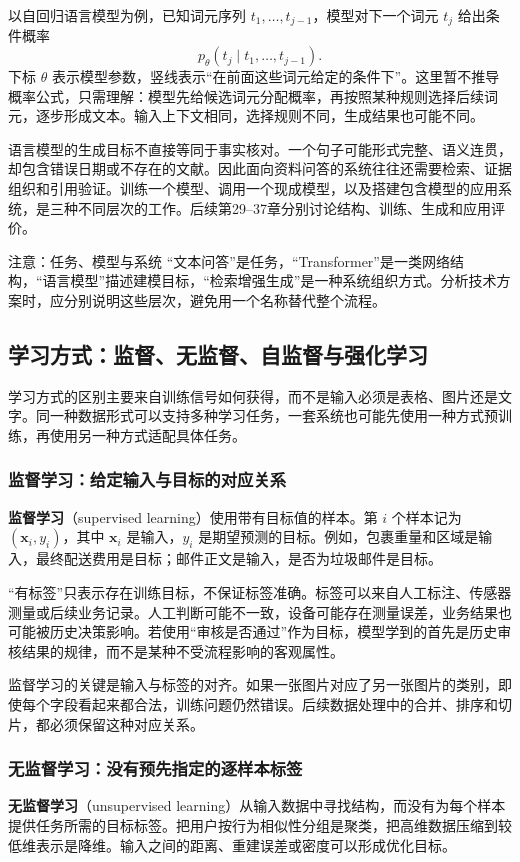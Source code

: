 \documentclass[UTF8,fontset=none,zihao=-4,a4paper]{ctexart}
\newcommand{\term}[1]{\textbf{#1}}
\numberwithin{equation}{section}
\numberwithin{figure}{section}
\begin{document}
以自回归语言模型为例，已知词元序列 $t_1,\ldots,t_{j-1}$，模型对下一个词元 $t_j$ 给出条件概率
\[
 p_\theta(t_j\mid t_1,\ldots,t_{j-1}).
\]
下标 $\theta$ 表示模型参数，竖线表示“在前面这些词元给定的条件下”。这里暂不推导概率公式，只需理解：模型先给候选词元分配概率，再按照某种规则选择后续词元，逐步形成文本。输入上下文相同，选择规则不同，生成结果也可能不同。

语言模型的生成目标不直接等同于事实核对。一个句子可能形式完整、语义连贯，却包含错误日期或不存在的文献。因此面向资料问答的系统往往还需要检索、证据组织和引用验证。训练一个模型、调用一个现成模型，以及搭建包含模型的应用系统，是三种不同层次的工作。后续第29--37章分别讨论结构、训练、生成和应用评价。

\begin{infobox}{注意：任务、模型与系统}
“文本问答”是任务，“Transformer”是一类网络结构，“语言模型”描述建模目标，“检索增强生成”是一种系统组织方式。分析技术方案时，应分别说明这些层次，避免用一个名称替代整个流程。
\end{infobox}

\subsection{学习方式：监督、无监督、自监督与强化学习}
学习方式的区别主要来自训练信号如何获得，而不是输入必须是表格、图片还是文字。同一种数据形式可以支持多种学习任务，一套系统也可能先使用一种方式预训练，再使用另一种方式适配具体任务。

\subsubsection{监督学习：给定输入与目标的对应关系}
\term{监督学习}（supervised learning）使用带有目标值的样本。第 $i$ 个样本记为 $(\symbf{x}_i,y_i)$，其中 $\symbf{x}_i$ 是输入，$y_i$ 是期望预测的目标。例如，包裹重量和区域是输入，最终配送费用是目标；邮件正文是输入，是否为垃圾邮件是目标。

“有标签”只表示存在训练目标，不保证标签准确。标签可以来自人工标注、传感器测量或后续业务记录。人工判断可能不一致，设备可能存在测量误差，业务结果也可能被历史决策影响。若使用“审核是否通过”作为目标，模型学到的首先是历史审核结果的规律，而不是某种不受流程影响的客观属性。

监督学习的关键是输入与标签的对齐。如果一张图片对应了另一张图片的类别，即使每个字段看起来都合法，训练问题仍然错误。后续数据处理中的合并、排序和切片，都必须保留这种对应关系。

\subsubsection{无监督学习：没有预先指定的逐样本标签}
\term{无监督学习}（unsupervised learning）从输入数据中寻找结构，而没有为每个样本提供任务所需的目标标签。把用户按行为相似性分组是聚类，把高维数据压缩到较低维表示是降维。输入之间的距离、重建误差或密度可以形成优化目标。
\end{document}
